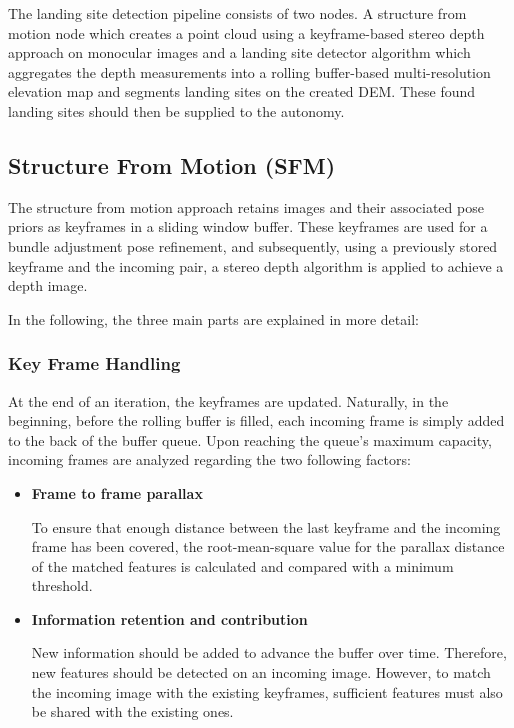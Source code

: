 The landing site detection pipeline consists of two nodes. A structure from motion node \citep{SFM} which creates a point cloud using a keyframe-based stereo depth approach on monocular images and a landing site detector algorithm \citep{LSD1, LSD2} which aggregates the depth measurements into a rolling buffer-based multi-resolution elevation map and segments landing sites on the created DEM. These found landing sites should then be supplied to the autonomy. 

\subsection{Structure From Motion (SFM)}\label{subsec:setup:SFM}

The structure from motion approach retains images and their associated pose priors as keyframes in a sliding window buffer. These keyframes are used for a bundle adjustment pose refinement, and subsequently, using a previously stored keyframe and the incoming pair, a stereo depth algorithm is applied to achieve a depth image. 

In the following, the three main parts are explained in more detail:

\subsubsection{Key Frame Handling}

At the end of an iteration, the keyframes are updated. Naturally, in the beginning, before the rolling buffer is filled, each incoming frame is simply added to the back of the buffer queue. Upon reaching the queue's maximum capacity, incoming frames are analyzed regarding the two following factors:

\begin{itemize}
    \item \textbf{Frame to frame parallax}

    To ensure that enough distance between the last keyframe and the incoming frame has been covered, the root-mean-square value for the parallax distance of the matched features is calculated and compared with a minimum threshold.
    \item \textbf{Information retention and contribution}

    New information should be added to advance the buffer over time. Therefore, new features should be detected on an incoming image. However, to match the incoming image with the existing keyframes, sufficient features must also be shared with the existing ones.
\end{itemize}


